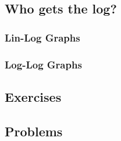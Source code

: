 \subsection{Who gets the log?}
\subsubsection{Lin-Log Graphs}
\subsubsection{Log-Log Graphs}
\newpage
\subsection{Exercises}


\newpage
{}
\subsection{Problems}
\noindent{}
\newpage
